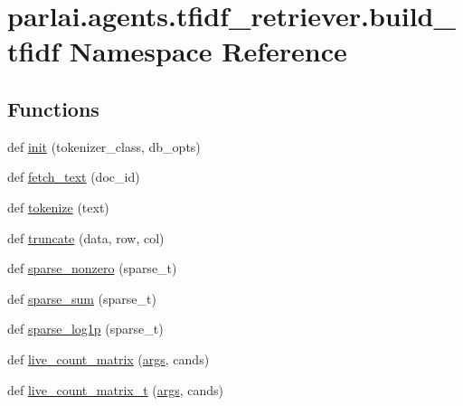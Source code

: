 \hypertarget{namespaceparlai_1_1agents_1_1tfidf__retriever_1_1build__tfidf}{}\section{parlai.\+agents.\+tfidf\+\_\+retriever.\+build\+\_\+tfidf Namespace Reference}
\label{namespaceparlai_1_1agents_1_1tfidf__retriever_1_1build__tfidf}
\subsection*{Functions}
\begin{DoxyCompactItemize}
\item 
def \hyperlink{namespaceparlai_1_1agents_1_1tfidf__retriever_1_1build__tfidf_a297d8a6b3ed43b31feccf5707517fee3}{init} (tokenizer\+\_\+class, db\+\_\+opts)
\item 
def \hyperlink{namespaceparlai_1_1agents_1_1tfidf__retriever_1_1build__tfidf_a8f16fdf4641c497d12c19f128ed4647a}{fetch\+\_\+text} (doc\+\_\+id)
\item 
def \hyperlink{namespaceparlai_1_1agents_1_1tfidf__retriever_1_1build__tfidf_a1fdb457e98eb4e4c26047e229686a616}{tokenize} (text)
\item 
def \hyperlink{namespaceparlai_1_1agents_1_1tfidf__retriever_1_1build__tfidf_a5bd546d494142d2d7e2772a3d60583f9}{truncate} (data, row, col)
\item 
def \hyperlink{namespaceparlai_1_1agents_1_1tfidf__retriever_1_1build__tfidf_a7ec5dffcb27b7ce23ea0a0e37ef2398d}{sparse\+\_\+nonzero} (sparse\+\_\+t)
\item 
def \hyperlink{namespaceparlai_1_1agents_1_1tfidf__retriever_1_1build__tfidf_a8852c505db2852b5e39be3468a9c1733}{sparse\+\_\+sum} (sparse\+\_\+t)
\item 
def \hyperlink{namespaceparlai_1_1agents_1_1tfidf__retriever_1_1build__tfidf_a89650718966a5b0d1114e8b06b8c0dcc}{sparse\+\_\+log1p} (sparse\+\_\+t)
\item 
def \hyperlink{namespaceparlai_1_1agents_1_1tfidf__retriever_1_1build__tfidf_af51dc8629608fd04435739ba76b1e8f2}{live\+\_\+count\+\_\+matrix} (\hyperlink{namespaceparlai_1_1agents_1_1tfidf__retriever_1_1build__tfidf_aa48318cbcc3882ee8fe371c672cbf941}{args}, cands)
\item 
def \hyperlink{namespaceparlai_1_1agents_1_1tfidf__retriever_1_1build__tfidf_af6a82e7b8a6efb75fb73be53b55a7787}{live\+\_\+count\+\_\+matrix\+\_\+t} (\hyperlink{namespaceparlai_1_1agents_1_1tfidf__retriever_1_1build__tfidf_aa48318cbcc3882ee8fe371c672cbf941}{args}, cands)

\end{DoxyCompactItemize}
